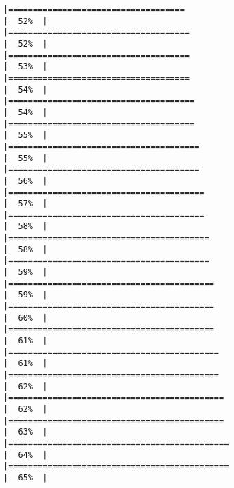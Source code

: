 \documentclass[
]{article}
\begin{document}
\begin{verbatim}
|====================================                                  |  52%  |                                                                              |=====================================                                 |  52%  |                                                                              |=====================================                                 |  53%  |                                                                              |=====================================                                 |  54%  |                                                                              |======================================                                |  54%  |                                                                              |======================================                                |  55%  |                                                                              |=======================================                               |  55%  |                                                                              |=======================================                               |  56%  |                                                                              |========================================                              |  57%  |                                                                              |========================================                              |  58%  |                                                                              |=========================================                             |  58%  |                                                                              |=========================================                             |  59%  |                                                                              |==========================================                            |  59%  |                                                                              |==========================================                            |  60%  |                                                                              |==========================================                            |  61%  |                                                                              |===========================================                           |  61%  |                                                                              |===========================================                           |  62%  |                                                                              |============================================                          |  62%  |                                                                              |============================================                          |  63%  |                                                                              |=============================================                         |  64%  |                                                                              |=============================================                         |  65%  |                                                                              
\end{verbatim}
\end{document}
